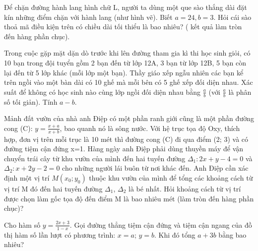 \begin{question}[type=short_answer,difficulty=4,code={III-3}]
Để chặn đường hành lang hình chữ L, người ta dùng một que sào thắng dài đặt kín những điểm chặn với hành lang (như hình vẽ). Biết $ a = 24, b = 3 $. Hỏi cái sào thoả mã điều kiện trên có chiều dài tối thiểu là bao nhiêu? ( kết quả làm tròn đến hàng phần chục).




\end{question}

\begin{question}[type=short_answer,difficulty=4,code={III-4}]
Trong cuộc gặp mặt dặn dò trước khi lên đường tham gia kì thi học sinh giỏi, có 10 bạn trong đội tuyển gồm 2 bạn đến từ lớp 12A, 3 bạn từ lớp 12B, 5 bạn còn lại đến từ 5 lớp khác (mỗi lớp một bạn). Thầy giáo xếp ngẫu nhiên các bạn kể trên ngồi vào một bàn dài có 10 ghế mà mỗi bên có 5 ghế xếp đối diện nhau. Xác suất để không có học sinh nào cùng lớp ngồi đối diện nhau bằng $ \frac{a}{b} $ (với $ \frac{a}{b} $ là phân số tối giản). Tính $ a-b $.


\end{question}

\begin{question}[type=short_answer,difficulty=4,code={III-5}]
Mảnh đất vườn của nhà anh Điệp có một phần ranh giới cũng là một phần đường cong (C):
 $ y=\frac{x+a}{x+b} $, bao quanh nó là sông nước. Với hệ trục tọa độ Oxy, thích hợp, đơn vị trên mỗi trục là
10 mét thì đường cong (C) đi qua điểm (2; 3) và có đường tiệm cận đứng x=1. Hàng ngày anh Điệp phải dùng thuyền máy để vận chuyển trái cây từ khu vườn của mình đến hai tuyến đường
 $ \Delta_{1}:2x+y-4=0 $ và $ \Delta_{2}:x+2y-2=0 $ cho những người lái buôn từ nơi khác đến. Anh Điệp cần xác định một vị trí $ M(x_{0};y_{0}) $ thuộc khu vườn của mình để tổng các khoảng cách từ vị trí M đó đến hai tuyến đường $ \Delta_{1} $, $ \Delta_{2} $ là bé nhất. Hỏi khoảng cách từ vị trí được chọn làm gốc tọa độ đến điểm M là bao nhiêu mét (làm tròn đến hàng phần chục)?




\end{question}

\begin{question}[type=short_answer,difficulty=1,code={III-6}]
Cho hàm số $y = \frac{2x + 3}{1 - x}$. Gọi đường thẳng tiệm cận đứng và tiệm cận ngang của đồ thị hàm số lần lượt có phương trình: $x = a$; $y = b$. Khi đó tổng $a + 3b$ bằng bao nhiêu?


\end{question}